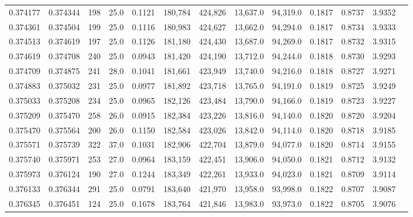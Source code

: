 \begin{tabular}{rrrrrrrrrrrrr}
0.374177 & 0.374344 &   198 & 25.0 &                                     0.1121 & 180,784 & 424,826 &  13,637.0 &  94,319.0 & 0.1817 & 0.8737 & 3.9352 \\
0.374361 & 0.374504 &   199 & 25.0 &                                     0.1116 & 180,983 & 424,627 &  13,662.0 &  94,294.0 & 0.1817 & 0.8734 & 3.9333 \\
0.374513 & 0.374619 &   197 & 25.0 &                                     0.1126 & 181,180 & 424,430 &  13,687.0 &  94,269.0 & 0.1817 & 0.8732 & 3.9315 \\
0.374619 & 0.374708 &   240 & 25.0 &                                     0.0943 & 181,420 & 424,190 &  13,712.0 &  94,244.0 & 0.1818 & 0.8730 & 3.9293 \\
0.374709 & 0.374875 &   241 & 28.0 &                                     0.1041 & 181,661 & 423,949 &  13,740.0 &  94,216.0 & 0.1818 & 0.8727 & 3.9271 \\
0.374883 & 0.375032 &   231 & 25.0 &                                     0.0977 & 181,892 & 423,718 &  13,765.0 &  94,191.0 & 0.1819 & 0.8725 & 3.9249 \\
0.375033 & 0.375208 &   234 & 25.0 &                                     0.0965 & 182,126 & 423,484 &  13,790.0 &  94,166.0 & 0.1819 & 0.8723 & 3.9227 \\
0.375209 & 0.375470 &   258 & 26.0 &                                     0.0915 & 182,384 & 423,226 &  13,816.0 &  94,140.0 & 0.1820 & 0.8720 & 3.9204 \\
0.375470 & 0.375564 &   200 & 26.0 &                                     0.1150 & 182,584 & 423,026 &  13,842.0 &  94,114.0 & 0.1820 & 0.8718 & 3.9185 \\
0.375571 & 0.375739 &   322 & 37.0 &                                     0.1031 & 182,906 & 422,704 &  13,879.0 &  94,077.0 & 0.1820 & 0.8714 & 3.9155 \\
0.375740 & 0.375971 &   253 & 27.0 &                                     0.0964 & 183,159 & 422,451 &  13,906.0 &  94,050.0 & 0.1821 & 0.8712 & 3.9132 \\
0.375973 & 0.376124 &   190 & 27.0 &                                     0.1244 & 183,349 & 422,261 &  13,933.0 &  94,023.0 & 0.1821 & 0.8709 & 3.9114 \\
0.376133 & 0.376344 &   291 & 25.0 &                                     0.0791 & 183,640 & 421,970 &  13,958.0 &  93,998.0 & 0.1822 & 0.8707 & 3.9087 \\
0.376345 & 0.376451 &   124 & 25.0 &                                     0.1678 & 183,764 & 421,846 &  13,983.0 &  93,973.0 & 0.1822 & 0.8705 & 3.9076 \\

\end{tabular}
